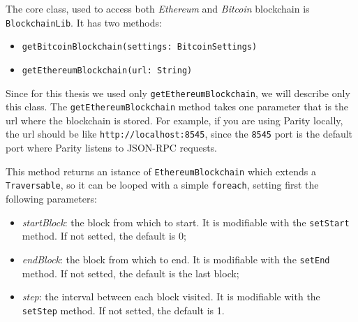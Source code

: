 The core class, used to access both \textit{Ethereum} and \textit{Bitcoin} blockchain is \texttt{BlockchainLib}. It has two methods:
\begin{itemize}
    \item \texttt{getBitcoinBlockchain(settings: BitcoinSettings)}
    \item \texttt{getEthereumBlockchain(url: String)}
\end{itemize}
Since for this thesis we used only \texttt{getEthereumBlockchain}, we will describe only this class. 
\newline
The \texttt{getEthereumBlockchain} method takes one parameter that is the url where the blockchain is stored.
For example, if you are using Parity locally, the url should be like \texttt{http://localhost:8545}, since the \texttt{8545} port is the default port where Parity listens to JSON-RPC requests.

This method returns an istance of \texttt{EthereumBlockchain} which extends a \texttt{Traversable}, so it can be looped with a simple \texttt{foreach}, setting first the following parameters:
\begin{itemize}
    \item \textit{startBlock}: the block from which to start. It is modifiable with the \texttt{setStart} method. If not setted, the default is 0;
    \item \textit{endBlock}: the block from which to end. It is modifiable with the \texttt{setEnd} method. If not setted, the default is the last block;
    \item \textit{step}: the interval between each block visited. It is modifiable with the \texttt{setStep} method. If not setted, the default is 1.
\end{itemize}

